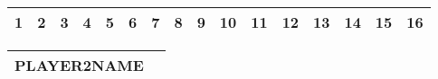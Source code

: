\documentclass[36pt]{scrartcl}
\begin{document}
\begin{table}
\begin{tabular}
\end{tabular}

\begin{tabular}{|c|c|c|c|c|c!{\vrule width 2pt}c|c|c|c|c|c|c|c|c|c|}
\hline
\bfseries \large 1 & \bfseries \large 2 & \bfseries \large 3 & \bfseries \large 4 & \bfseries \large 5 & \bfseries \large 6 & \bfseries \large 7 & \bfseries \large 8 & \bfseries \large 9 & \bfseries \large 10 & \bfseries \large 11 & \bfseries \large 12 & \bfseries \large 13 & \bfseries \large 14 & \bfseries \large 15 & \bfseries \large 16 \\
\hline
\end{tabular}


\begin{tabular}{|p{15cm}!{\vrule width 3pt}p{2cm}!{\vrule width 3pt}}
\hline
\bfseries PLAYER2NAME & \\
\hline
\end{tabular}

\end{table}
\end{document}
